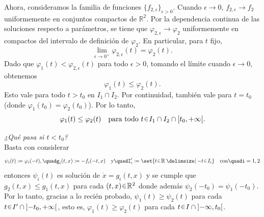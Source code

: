 \begin{sol}[Demostración]
Ahora, consideramos la familia de funciones $\{ f_{2,\epsilon} \}_{\epsilon > 0}$. Cuando $\epsilon \to 0$, $f_{2,\epsilon} \to f_2$ uniformemente en conjuntos compactos de $\mathbb{R}^2$. Por la dependencia continua de las soluciones respecto a parámetros, se tiene que $\varphi_{2,\epsilon} \to \varphi_2$ uniformemente en compactos del intervalo de definición de $\varphi_2$. En particular, para $t$ fijo,
\[
\lim_{\epsilon \to 0^+} \varphi_{2,\epsilon}(t) = \varphi_2(t).
\]
Dado que $\varphi_1(t) < \varphi_{2,\epsilon}(t)$ para todo $\epsilon > 0$, tomando el límite cuando $\epsilon \to 0$, obtenemos
\[
\varphi_1(t) \leq \varphi_2(t).
\]
Esto vale para todo $t > t_0$ en $I_1 \cap I_2$. Por continuidad, también vale para $t = t_0$ (donde $\varphi_1(t_0) = \varphi_2(t_0)$). Por lo tanto,
\[
\varphi_1(t) \leq \varphi_2(t) \quad \text{para todo } t \en I_1 \cap I_2 \cap [t_0, +\infty[.
\]

\emph{¿Qué pasa si $t < t_0$?}\\ 
Basta con considerar 
\[
    \psi_i(t) \coloneq \varphi_i(-t)%
    ,\quad%
    g_i(t,x) \coloneq -f_i(-t,x)%
    \quad\text{y}\quad%
    I'_i \coloneq \set{t \en \mathbb{R} \given -t \en I_i}%
    \quad\text{con}\quad%
    i = 1,2
\]
entonces $\psi_i(t)$ es solución de $\dot{x} = g_i(t,x)$ y se cumple que $g_2(t,x) \leq g_1(t,x)$ para cada $(t, x) \en \mathbb{R}^2$ donde además $\psi_2(-t_0) = \psi_1(-t_0)$. Por lo tanto, gracias a lo recién probado, $\psi_1(t) \geq \psi_2(t)$ para cada $t \en I' \cap {]{-t_0}, +\infty[}$, esto es, $\varphi_1(t) \geq \varphi_2(t)$ para cada $t \en I \cap {]{-\infty}, t_0[}$.


\end{sol}
